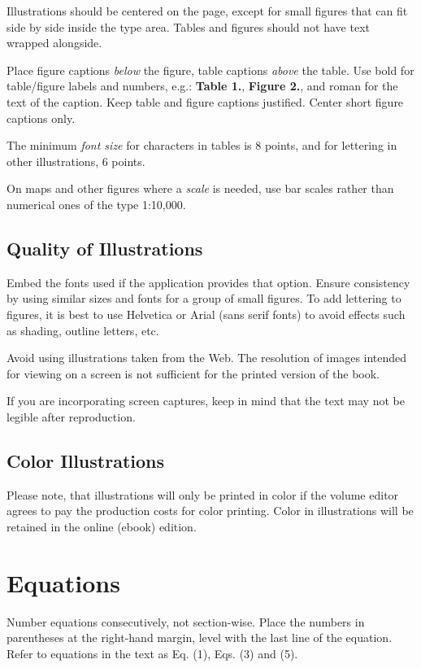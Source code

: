 \documentclass{IOS-Book-Article}
\begin{document}
Illustrations should be centered on the page, except for small figures that can fit
side by side inside the type area. Tables and figures should not have text wrapped
alongside.

Place figure captions \textit{below} the figure, table captions \textit{above} the table.
Use bold for table/figure labels and numbers, e.g.: \textbf{Table 1.}, \textbf{Figure 2.},
and roman for the text of the caption. Keep table and figure captions justified. Center
short figure captions only.

The minimum \textit{font size} for characters in tables is 8 points, and for lettering in other
illustrations, 6 points.

On maps and other figures where a \textit{scale} is needed, use bar scales rather than
numerical ones of the type 1:10,000.

\subsection{Quality of Illustrations}
Embed the fonts used if the application provides that option.
Ensure consistency by using similar sizes and fonts for a group of small figures.
To add lettering to figures, it is best to use Helvetica or Arial (sans serif fonts)
to avoid effects such as shading, outline letters, etc.

 Avoid using illustrations
taken from the Web. The resolution of images intended for viewing on a screen is
not sufficient for the printed version of the book.

If you are incorporating screen captures, keep in mind that the text may not be
legible after reproduction.

\subsection{Color Illustrations}
Please note, that illustrations will only be printed in color if the volume editor agrees to
pay the production costs for color printing. Color in illustrations will be retained
in the online (ebook) edition.


\section{Equations}
Number equations consecutively, not section-wise. Place the numbers in parentheses at
the right-hand margin, level with the last line of the equation. Refer to equations in the
text as Eq. (1), Eqs. (3) and (5).
\end{document}
